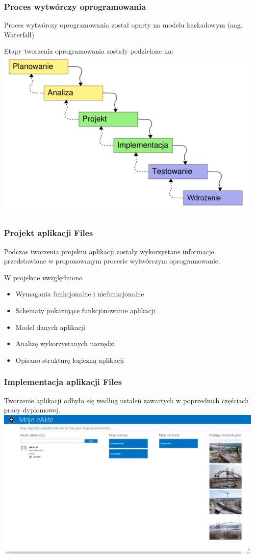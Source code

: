 \documentclass{beamer}
\begin{document}
\begin{frame}
\frametitle{Proces wytwórczy oprogramowania}
Proces wytwórczy oprogramowania został oparty na modelu kaskadowym (ang. Waterfall)

Etapy tworzenia oprogramowania zostały podzielone na:
 \includegraphics[width=\textwidth]{images/WaterfallSteps.png}
\end{frame}

\begin{frame}
\frametitle{Projekt aplikacji Files}
Podczas tworzenia projektu aplikacji zostały wykorzystane informacje przedstawione w proponowanym procesie wytwórczym oprogramowanie.

W projekcie uwzględniono
\begin{itemize}[<+->]
\item Wymagania funkcjonalne i niefunkcjonalne
\item Schematy pokazujące funkcjonowanie aplikacji
\item Model danych aplikacji
\item Analizę wykorzystanych narzędzi
\item Opisano strukturę logiczną aplikacji
\end{itemize}
\end{frame}

\begin{frame}
\frametitle{Implementacja aplikacji Files}
Tworzenie aplikacji odbyło się według ustaleń zawartych w poprzednich częściach pracy dyplomowej.
\includegraphics[width=\textwidth]{images/WebSite_View.jpg}
\end{frame}
\end{document}

